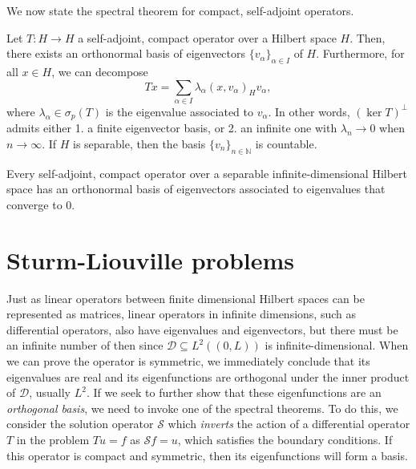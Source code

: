 We now state the spectral theorem for compact, self-adjoint operators. 
\begin{theorem}\label{thm:spectral-compact-selfadjoint}
    Let $T:H\to H$ a self-adjoint, compact operator over a Hilbert space $H$. Then, there exists an orthonormal basis of eigenvectors $\{v_\alpha\}_{\alpha\in I}$ of $H$. Furthermore, for all $x\in H$, we can decompose 
    \begin{equation}
        Tx = \sum_{\alpha\in I} \lambda_\alpha(x,v_\alpha)_H v_\alpha,
    \end{equation}
    where $\lambda_\alpha\in\sigma_p(T)$ is the eigenvalue associated to $v_\alpha$. In other words, $(\ker T)^\bot$ admits either 1. a finite eigenvector basis, or 2. an infinite one with $\lambda_n\to 0$ when $n\to\infty$. If $H$ is separable, then the basis $\{v_n\}_{n\in \mathbb{N}}$ is countable.
\end{theorem}
\begin{corollary}\label{cor:compact-selfadjoint-eigenvalues-conv-zero}
    Every self-adjoint, compact operator over a separable infinite-dimensional Hilbert space has an orthonormal basis of eigenvectors associated to eigenvalues that converge to $0$. 
\end{corollary}

\section{Sturm-Liouville problems}\label{sec:sturm-liouville}
Just as linear operators between finite dimensional Hilbert spaces can be represented as matrices, linear operators in infinite dimensions, such as differential operators, also have eigenvalues and eigenvectors, but there must be an infinite number of then since $\mathcal{D}\subseteq L^2((0,L))$ is infinite-dimensional. When we can prove the operator is symmetric, we immediately conclude that its eigenvalues are real and its eigenfunctions are orthogonal under the inner product of $\mathcal{D}$, usually $L^2$. If we seek to further show that these eigenfunctions are an \emph{orthogonal basis}, we need to invoke one of the spectral theorems. To do this, we consider the solution operator $\mathcal{S}$ which \emph{inverts} the action of a differential operator $T$ in the problem $Tu=f$ as $\mathcal{S}f = u$, which satisfies the boundary conditions. If this operator is compact and symmetric, then its eigenfunctions will form a basis. 

